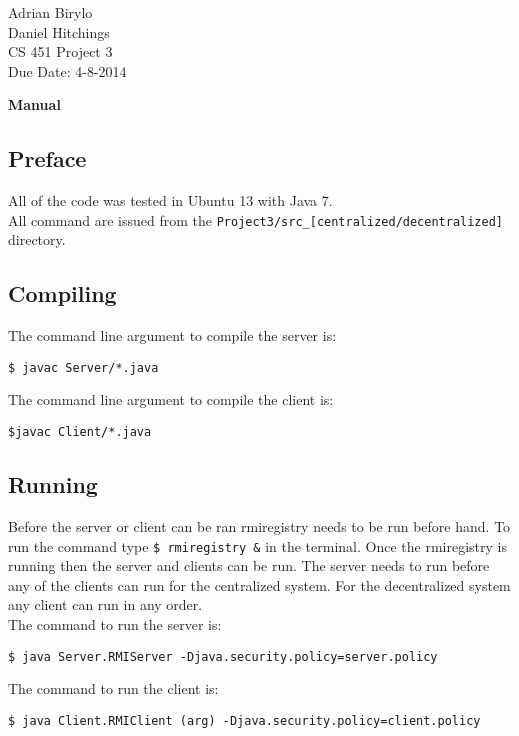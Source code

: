 \documentclass{article}
\begin{document}
\begin{flushright}
Adrian Birylo\\
Daniel Hitchings\\
CS 451 Project 3\\
Due Date: 4-8-2014\\
\end{flushright}

\begin{center}
\textbf{\huge{Manual}}
\end{center}



\subsection*{Preface}
All of the code was tested in Ubuntu 13 with Java 7. \\
All command are issued from the \texttt{Project3/src\_[centralized/decentralized]} directory. 

\subsection*{Compiling}
The command line argument to compile the server is: 

\begin{verbatim}
$ javac Server/*.java
\end{verbatim}

The command line argument to compile the client is:

\begin{verbatim}
$javac Client/*.java
\end{verbatim}

\subsection*{Running}

Before the server or client can be ran rmiregistry needs to be run before hand. To run the command type \texttt{\$ rmiregistry \&} in the terminal. Once the rmiregistry is running then the server and clients can be run. The server needs to run before any of the clients can run for the centralized system. For the decentralized system any client can run in any order.\\

\noindent
The command to run the server is:
\begin{verbatim}
$ java Server.RMIServer -Djava.security.policy=server.policy
\end{verbatim}
\noindent
The command to run the client is:
\begin{verbatim}
$ java Client.RMIClient (arg) -Djava.security.policy=client.policy
\end{verbatim}
\end{document}
